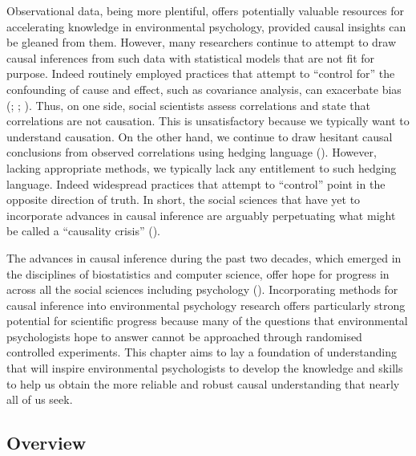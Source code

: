 \documentclass[
  singlecolumn]{article}
\begin{document}
Observational data, being more plentiful, offers potentially valuable
resources for accelerating knowledge in environmental psychology,
provided causal insights can be gleaned from them. However, many
researchers continue to attempt to draw causal inferences from such data
with statistical models that are not fit for purpose. Indeed routinely
employed practices that attempt to ``control for'' the confounding of
cause and effect, such as covariance analysis, can exacerbate bias
(;
;
). Thus, on
one side, social scientists assess correlations and state that
correlations are not causation. This is unsatisfactory because we
typically want to understand causation. On the other hand, we continue
to draw hesitant causal conclusions from observed correlations using
hedging language (). However,
lacking appropriate methods, we typically lack any entitlement to such
hedging language. Indeed widespread practices that attempt to
``control'' point in the opposite direction of truth. In short, the
social sciences that have yet to incorporate advances in causal
inference are arguably perpetuating what might be called a ``causality
crisis'' ().

The advances in causal inference during the past two decades, which
emerged in the disciplines of biostatistics and computer science, offer
hope for progress in across all the social sciences including psychology
(). Incorporating
methods for causal inference into environmental psychology research
offers particularly strong potential for scientific progress because
many of the questions that environmental psychologists hope to answer
cannot be approached through randomised controlled experiments. This
chapter aims to lay a foundation of understanding that will inspire
environmental psychologists to develop the knowledge and skills to help
us obtain the more reliable and robust causal understanding that nearly
all of us seek.

\subsection{Overview}\label{overview}
\end{document}

